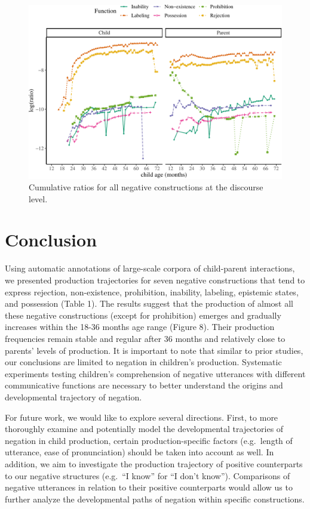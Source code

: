 \documentclass[
  english,
  man,floatsintext]{apa6}
\begin{document}
\begin{figure}[H]

{\centering \includegraphics{neg_construction_article_files/figure-latex/alldiscourse-1} 

}

\caption{Cumulative ratios for all negative constructions at the discourse level.}\label{fig:alldiscourse}
\end{figure}

\hypertarget{conclusion}{%
\section{Conclusion}\label{conclusion}}

Using automatic annotations of large-scale corpora of child-parent interactions, we presented production trajectories for seven negative constructions that tend to express rejection, non-existence, prohibition, inability, labeling, epistemic states, and possession (Table 1). The results suggest that the production of almost all these negative constructions (except for prohibition) emerges and gradually increases within the 18-36 months age range (Figure 8). Their production frequencies remain stable and regular after 36 months and relatively close to parents' levels of production. It is important to note that similar to prior studies, our conclusions are limited to negation in children's production. Systematic experiments testing children's comprehension of negative utterances with different communicative functions are necessary to better understand the origins and developmental trajectory of negation.

For future work, we would like to explore several directions. First, to more thoroughly examine and potentially model the developmental trajectories of negation in child production, certain production-specific factors (e.g.~length of utterance, ease of pronunciation) should be taken into account as well. In addition, we aim to investigate the production trajectory of positive counterparts to our negative structures (e.g.~``I know'' for ``I don't know''). Comparisons of negative utterances in relation to their positive counterparts would allow us to further analyze the developmental paths of negation within specific constructions.
\end{document}
